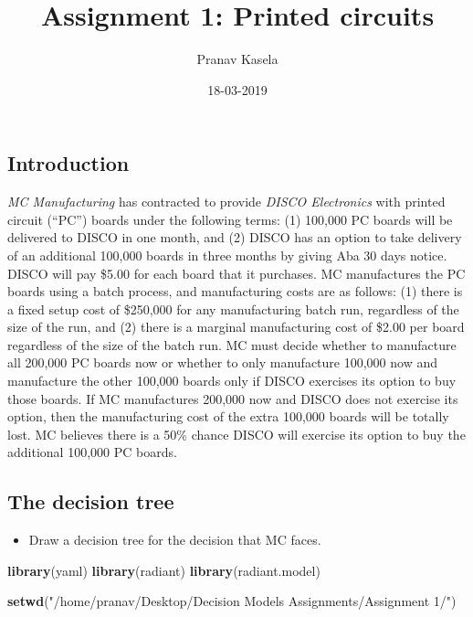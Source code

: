 \documentclass[]{article}
\title{Assignment 1: Printed circuits}
\author{Pranav Kasela}
\date{18-03-2019}
\newenvironment{Shaded}{\begin{snugshade}}{\end{snugshade}}
\newcommand{\KeywordTok}[1]{\textcolor[rgb]{0.13,0.29,0.53}{\textbf{#1}}}
\newcommand{\StringTok}[1]{\textcolor[rgb]{0.31,0.60,0.02}{#1}}
\newcommand{\NormalTok}[1]{#1}
\providecommand{\tightlist}{%
  \setlength{\itemsep}{0pt}\setlength{\parskip}{0pt}}
\begin{document}
\maketitle

\subsection{Introduction}\label{introduction}

\emph{MC Manufacturing} has contracted to provide \emph{DISCO
Electronics} with printed circuit (``PC'') boards under the following
terms: (1) 100,000 PC boards will be delivered to DISCO in one month,
and (2) DISCO has an option to take delivery of an additional 100,000
boards in three months by giving Aba 30 days notice. DISCO will pay
\$5.00 for each board that it purchases. MC manufactures the PC boards
using a batch process, and manufacturing costs are as follows: (1) there
is a fixed setup cost of \$250,000 for any manufacturing batch run,
regardless of the size of the run, and (2) there is a marginal
manufacturing cost of \$2.00 per board regardless of the size of the
batch run. MC must decide whether to manufacture all 200,000 PC boards
now or whether to only manufacture 100,000 now and manufacture the other
100,000 boards only if DISCO exercises its option to buy those boards.
If MC manufactures 200,000 now and DISCO does not exercise its option,
then the manufacturing cost of the extra 100,000 boards will be totally
lost. MC believes there is a 50\% chance DISCO will exercise its option
to buy the additional 100,000 PC boards.

\subsection{The decision tree}\label{the-decision-tree}

\begin{itemize}
\tightlist
\item
  Draw a decision tree for the decision that MC faces.
\end{itemize}

\begin{Shaded}
\begin{Highlighting}[]
\KeywordTok{library}\NormalTok{(yaml)}
\KeywordTok{library}\NormalTok{(radiant)}
\KeywordTok{library}\NormalTok{(radiant.model)}
\end{Highlighting}
\end{Shaded}

\begin{Shaded}
\begin{Highlighting}[]
\KeywordTok{setwd}\NormalTok{(}\StringTok{"/home/pranav/Desktop/Decision Models Assignments/Assignment 1/"}\NormalTok{)}
\end{Highlighting}
\end{Shaded}
\end{document}
